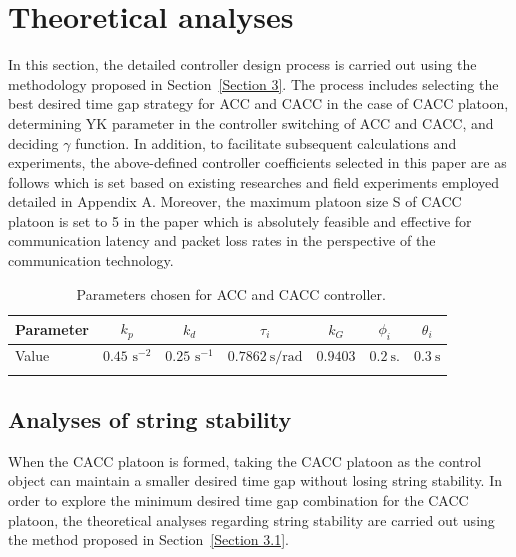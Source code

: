 \documentclass[a4paper,fleqn]{cas-sc}
\begin{document}
\section{Theoretical analyses}
\label{Section 4}
In this section, the detailed controller design process is carried out using the methodology proposed in Section~\ref{Section 3}. The process includes selecting the best desired time gap strategy for ACC and CACC in the case of CACC platoon, determining YK parameter in the controller switching of ACC and CACC, and deciding $\gamma$ function. In addition, to facilitate subsequent calculations and experiments, the above-defined controller coefficients selected in this paper are as follows which is set based on existing researches \citep{milanes2014modeling,milanes2013cooperative,navas2016using} and field experiments employed detailed in Appendix A. Moreover, the maximum platoon size S of CACC platoon is set to 5 in the paper which is absolutely feasible and effective for communication latency and packet loss rates in the perspective of the communication technology.
\begin{table}
  \centering
  \setlength{\abovecaptionskip}{0pt}
  \setlength{\belowcaptionskip}{10pt}%
  \caption{~Parameters chosen for ACC and CACC controller.}
  {\begin{tabular}{lcccccc} \toprule
      Parameter & $k_{p}$ & $k_{d}$ & $\tau_{i}$ & $k_{G}$ & $\phi_{i}$ & $\theta_{i}$ \\ \midrule Value & $0.45$ $ \mathrm{s}^{-2}$ & $0.25 $ $ \mathrm{s}^{-1}$ & $0.7862 \mathrm{~s} / \mathrm{rad}$ & $0.9403$ & $0.2 \mathrm{~s}.$ & $0.3 \mathrm{~s}$ \\ \bottomrule
      \label{table1}
    \end{tabular}}

\end{table}

\subsection{Analyses of string stability}
\label{Section 4.1}

When the CACC platoon is formed, taking the CACC platoon as the control object can maintain a smaller desired time gap without losing string stability. In order to explore the minimum desired time gap combination for the CACC platoon, the theoretical analyses regarding string stability are carried out using the method proposed in Section~\ref{Section 3.1}.
\end{document}
